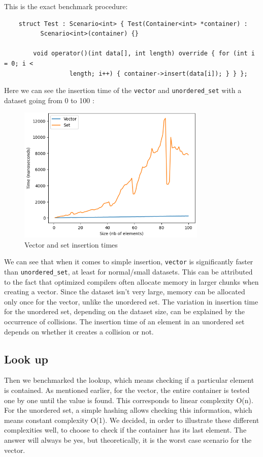 \documentclass[conference]{IEEEtran} \IEEEoverridecommandlockouts \usepackage{graphicx}
\def\code#1{\texttt{#1}}
\begin{document}
This is the exact benchmark procedure:
\begin{lstlisting}
	struct Test : Scenario<int> { Test(Container<int> *container) :
          Scenario<int>(container) {}
		
		void operator()(int data[], int length) override { for (int i = 0; i <
                  length; i++) { container->insert(data[i]); } } };
\end{lstlisting}

Here we can see the insertion time of the \code{vector} and \code{unordered\_set} with a
dataset going from 0 to 100 :

\begin{figure}[!h]
	\includegraphics[width=9cm]{Diagram/insertion.png}
	\caption{Vector and set insertion times}
	\label{vector vs set insertion}
\end{figure}

We can see that when it comes to simple insertion, \code{vector} is significantly faster
than \code{unordered\_set}, at least for normal/small datasets.  This can be attributed to
the fact that optimized compilers often allocate memory in larger chunks when creating a
vector.  Since the dataset isn't very large, memory can be allocated only once for the
vector, unlike the unordered set. The variation in insertion time for the unordered set,
depending on the dataset size, can be explained by the occurrence of collisions. The
insertion time of an element in an unordered set depends on whether it creates a collision
or not.

\subsection{Look up}

Then we benchmarked the lookup, which means checking if a particular element is
contained. As mentioned earlier, for the vector, the entire container is tested one by one
until the value is found. This corresponds to linear complexity O(n). For the unordered
set, a simple hashing allows checking this information, which means constant complexity
O(1). We decided, in order to illustrate these different complexities well, to choose to
check if the container has its last element. The answer will always be yes, but
theoretically, it is the worst case scenario for the vector.
\end{document}
